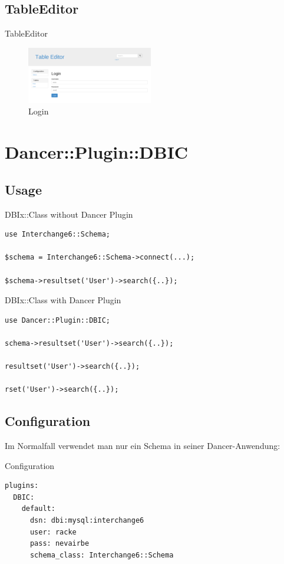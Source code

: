 \subsection{TableEditor}
\begin{frame}{TableEditor}
\begin{figure}
\includegraphics{images/te-login.png}
\caption{Login}
\end{figure}
\end{frame}

\section{Dancer::Plugin::DBIC}
\subsection{Usage}
\begin{frame}[fragile]{DBIx::Class without Dancer Plugin}
\begin{lstlisting}
use Interchange6::Schema;

$schema = Interchange6::Schema->connect(...);

$schema->resultset('User')->search({..});
\end{lstlisting}
\end{frame}

\begin{frame}[fragile]{DBIx::Class with Dancer Plugin}
\begin{lstlisting}
use Dancer::Plugin::DBIC;

schema->resultset('User')->search({..});

resultset('User')->search({..});

rset('User')->search({..});
\end{lstlisting}
\end{frame}

\subsection{Configuration}

Im Normalfall verwendet man nur ein Schema in seiner
Dancer-Anwendung:

\begin{frame}[fragile]{Configuration}
\begin{lstlisting}
plugins:
  DBIC:
    default:
      dsn: dbi:mysql:interchange6
      user: racke
      pass: nevairbe
      schema_class: Interchange6::Schema
\end{lstlisting}
\end{frame}

